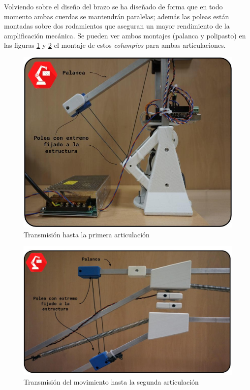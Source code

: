     Volviendo sobre el diseño del brazo se ha diseñado de forma que en todo momento ambas cuerdas se mantendrán paralelas; además las poleas están montadas sobre dos rodamientos que aseguran un mayor rendimiento de la amplificación mecánica. Se pueden ver ambos montajes (palanca y polipasto) en las figuras \ref{fig:Mecanica:columpio_art_uno} y \ref{fig:Mecanica:columpio_art_dos} el montaje de estos \textit{columpios} para ambas articulaciones.

    \begin{minipage}{0.41\textwidth}
        \begin{figure}[H]
            \centering
            \includegraphics[width=\textwidth]{figuras/Imagenes_Mecanica/foto_brazo_7.jpg}
            \caption{Transmisión hasta la primera articulación}
            \label{fig:Mecanica:columpio_art_uno}
        \end{figure}
    \end{minipage}
    \begin{minipage}{0.56\textwidth}\raggedright
        \begin{figure}[H]
            \centering
            \includegraphics[width=\textwidth]{figuras/Imagenes_Mecanica/foto_brazo_9.jpg}
            \caption{Transmisión del movimiento hasta la segunda articulación}
            \label{fig:Mecanica:columpio_art_dos}
        \end{figure}
    \end{minipage}

